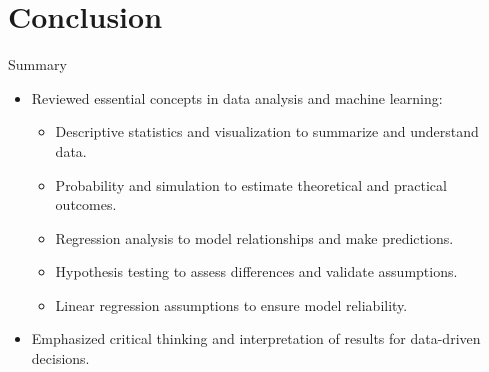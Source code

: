 \documentclass{beamer}
\begin{document}
\section{Conclusion}

\begin{frame}{Summary}
\begin{itemize}
    \item Reviewed essential concepts in data analysis and machine learning:
    \begin{itemize}
        \item Descriptive statistics and visualization to summarize and understand data.
        \item Probability and simulation to estimate theoretical and practical outcomes.
        \item Regression analysis to model relationships and make predictions.
        \item Hypothesis testing to assess differences and validate assumptions.
        \item Linear regression assumptions to ensure model reliability.
    \end{itemize}
    \item Emphasized critical thinking and interpretation of results for data-driven decisions.
\end{itemize}
\end{frame}



\frame{\titlepage}
\end{document}
